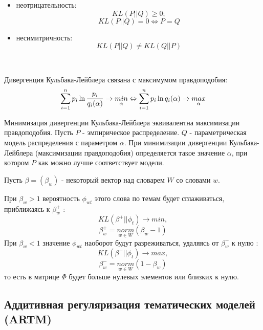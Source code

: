 \begin{itemize}
    \item неотрицательность:
        $$
        KL(P||Q)\ge 0;
        $$
        $$
        KL(P||Q)=0 \Leftrightarrow P=Q
        $$
    \item несимитричность:
        $$
        KL(P||Q)\neq KL(Q||P)
        $$
\end{itemize}

~\

Дивергенция Кульбака-Лейблера связана с максимумом правдоподобия:
\begin{equation}
\sum_{i=1}^{n}p_i\ln{p_i \over {q_i(\alpha)}} \rightarrow \underset{\alpha}{min} \Leftrightarrow \sum_{i=1}^{n}p_i\ln{q_i(\alpha)} \rightarrow \underset{\alpha}{max}
\end{equation}

Минимизация дивергенции Кульбака-Лейблера эквивалентна максимизации правдоподобия. Пусть $P$ - эмпирическое распределение. $Q$ - параметрическая модель распределения с параметром $\alpha$. При минимизации дивергенции Кульбака-Лейблера (максимизации правдоподобия) определяется такое значение $\alpha$, при котором $P$ как можно лучше соответствует модели.

Пусть $\beta=(\beta_w)$ - некоторый вектор над словарем $W$ со словами $w$.

При $\beta_w>1$ вероятность $\phi_{wt}$ этого слова по темам будет сглаживаться, приближаясь к $\beta_w^+$ : 
\begin{equation}
KL(\beta^+||\phi_t) \rightarrow min,
\end{equation}
\begin{equation}
\beta_w^+=\underset{w \in W}{norm}(\beta_w-1)
\end{equation}
При $\beta_w<1$ значение $\phi_{wt}$ наоборот будут разреживаться, удаляясь от $\beta_w^-$ к нулю : 
\begin{equation}
KL(\beta^-||\phi_t) \rightarrow max,
\end{equation}
\begin{equation}
\beta_w^-=\underset{w \in W}{norm}(1-\beta_w)
\end{equation}
то есть в матрице $\Phi$ будет больше нулевых элементов или близких к нулю.

\subsection{Аддитивная регуляризация тематических моделей (ARTM)}

